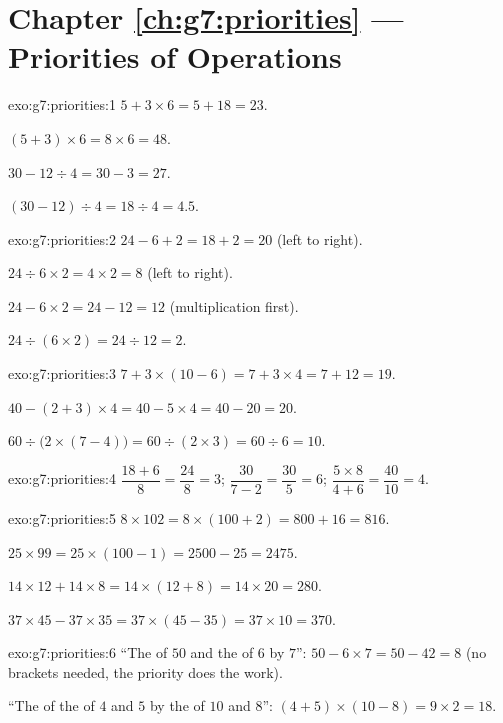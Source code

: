 \section*{Chapter \ref{ch:g7:priorities} --- Priorities of Operations}

\begin{solution}{exo:g7:priorities:1}
$5 + 3 \times 6 = 5 + 18 = 23$.

$(5 + 3) \times 6 = 8 \times 6 = 48$.

$30 - 12 \div 4 = 30 - 3 = 27$.

$(30 - 12) \div 4 = 18 \div 4 = 4.5$.
\end{solution}

\begin{solution}{exo:g7:priorities:2}
$24 - 6 + 2 = 18 + 2 = 20$ (left to right).

$24 \div 6 \times 2 = 4 \times 2 = 8$ (left to right).

$24 - 6 \times 2 = 24 - 12 = 12$ (multiplication first).

$24 \div (6 \times 2) = 24 \div 12 = 2$.
\end{solution}

\begin{solution}{exo:g7:priorities:3}
$7 + 3 \times (10 - 6) = 7 + 3 \times 4 = 7 + 12 = 19$.

$40 - (2 + 3) \times 4 = 40 - 5 \times 4 = 40 - 20 = 20$.

$60 \div \bigl(2 \times (7 - 4)\bigr) = 60 \div (2 \times 3)
= 60 \div 6 = 10$.
\end{solution}

\begin{solution}{exo:g7:priorities:4}
$\dfrac{18 + 6}{8} = \dfrac{24}{8} = 3$; \quad
$\dfrac{30}{7 - 2} = \dfrac{30}{5} = 6$; \quad
$\dfrac{5 \times 8}{4 + 6} = \dfrac{40}{10} = 4$.
\end{solution}

\begin{solution}{exo:g7:priorities:5}
$8 \times 102 = 8 \times (100 + 2) = 800 + 16 = 816$.

$25 \times 99 = 25 \times (100 - 1) = 2500 - 25 = 2475$.

$14 \times 12 + 14 \times 8 = 14 \times (12 + 8) = 14 \times 20 = 280$.

$37 \times 45 - 37 \times 35 = 37 \times (45 - 35) = 37 \times 10 =
370$.
\end{solution}

\begin{solution}{exo:g7:priorities:6}
``The  of $50$ and the  of $6$ by $7$'':
$50 - 6 \times 7 = 50 - 42 = 8$ (no brackets needed, the priority does
the work).

``The  of the  of $4$ and $5$ by the  of $10$ and
$8$'': $(4 + 5) \times (10 - 8) = 9 \times 2 = 18$.
\end{solution}

